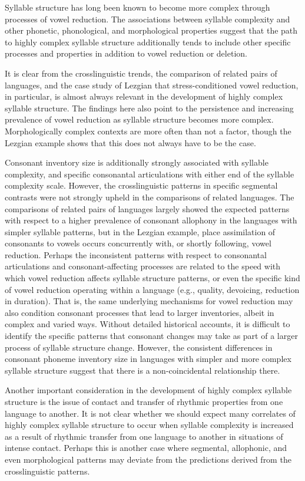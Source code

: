   Syllable structure has long been known to become more complex through processes of vowel reduction. The associations between syllable complexity and other phonetic, phonological, and morphological properties suggest that the path to highly complex syllable structure additionally tends to include other specific processes and properties in addition to vowel reduction or deletion.

  It is clear from the crosslinguistic trends, the comparison of related pairs of languages, and the case study of Lezgian that stress-conditioned vowel reduction, in particular, is almost always relevant in the development of highly complex syllable structure. The findings here also point to the persistence and increasing prevalence of vowel reduction as syllable structure becomes more complex. Morphologically complex contexts are more often than not a factor, though the Lezgian example shows that this does not always have to be the case.

  Consonant inventory size is additionally strongly associated with syllable complexity, and specific consonantal articulations with either end of the syllable complexity scale. However, the crosslinguistic patterns in specific segmental contrasts were not strongly upheld in the comparisons of related languages. The comparisons of related pairs of languages largely showed the expected patterns with respect to a higher prevalence of consonant allophony in the languages with simpler syllable patterns, but in the Lezgian example, place assimilation of consonants to vowels occurs concurrently with, or shortly following, vowel reduction. Perhaps the inconsistent patterns with respect to consonantal articulations and consonant-affecting processes are related to the speed with which vowel reduction affects syllable structure patterns, or even the specific kind of vowel reduction operating within a language (e.g., quality, devoicing, reduction in duration). That is, the same underlying mechanisms for vowel reduction may also condition consonant processes that lead to larger inventories, albeit in complex and varied ways. Without detailed historical accounts, it is difficult to identify the specific patterns that consonant changes may take as part of a larger process of syllable structure change. However, the consistent differences in consonant phoneme inventory size in languages with simpler and more complex syllable structure suggest that there is a non-coincidental relationship there.

  Another important consideration in the development of highly complex syllable structure is the issue of contact and transfer of rhythmic properties from one language to another. It is not clear whether we should expect many correlates of highly complex syllable structure to occur when syllable complexity is increased as a result of rhythmic transfer from one language to another in situations of intense contact. Perhaps this is another case where segmental, allophonic, and even morphological patterns may deviate from the predictions derived from the crosslinguistic patterns.


